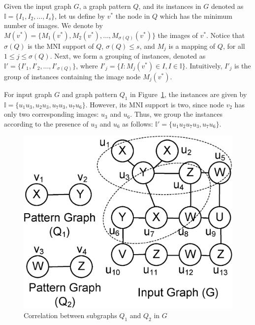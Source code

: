 \begin{defn}
\label{def:instance_grouping}
Given the input graph $G$, a graph pattern $Q$, and its instances in $G$ denoted as $\mathbb{I}=\{I_1,I_2,\ldots,I_s\}$,
let us define by $v^*$ the node in $Q$ which has the minimum number of images. We denote by
$M(v^*)=\{M_1(v^*),M_2(v^*),\ldots,M_{\sigma(Q)}(v^*)\}$ the images of $v^*$. Notice that
$\sigma(Q)$ is the MNI support of $Q$, $\sigma(Q)\le s$, and $M_j$ is
a mapping of $Q$, for all $1 \le j \le \sigma(Q)$. Next, we form a grouping
of instances, denoted as $\mathbb{I'}=\{I'_1,I'_2,\ldots,I'_{\sigma(Q)}\}$, where
$I'_j= \{I:M_j(v^*) \in I, I \in \mathbb{I}\}$. Intuitively,
$I'_j$ is the group of instances containing the image node $M_j(v^*)$.
\end{defn}
%
\begin{exple}
For input graph $G$ and graph pattern $Q_1$ in Figure~\ref{fig:correlation},
the instances are
given by $\mathbb{I}=\{u_1u_3,u_2u_3,u_7u_3,u_7u_6\}$. However, its MNI support is two, since
node $v_2$ has only two corresponding images: $u_3$ and $u_6$. Thus, we group the instances
according to the presence of $u_3$ and $u_6$ as follows: $\mathbb{I'}=\{u_1u_2u_7u_3,u_7u_6\}$.
\end{exple}

\begin{figure}[t!]
\centering
\includegraphics[scale=0.23]{images/correlation}
\vspace{-2mm}
\caption{\small Correlation between subgraphs $Q_1$ and $Q_2$ in $G$}
\label{fig:correlation}
\vspace{-5mm}
\end{figure}

